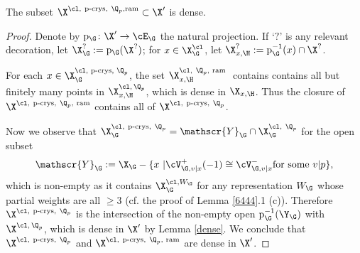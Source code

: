  \begin{lemm} 
 The subset $\X^{\cl,\ \textup{p-crys}, \  \Q_{p}, \textup{ram}}  \subset \X'$ is dense.
 \end{lemm}
 \begin{proof}
Denote by ${\rm p}_{\G} \colon \X' \to \cE_{\G}$ the natural projection.
 If  `$?$' is any relevant decoration, let  $\X_{\G}^{?}:= {\rm p}_{\G}(\X^{?})$; for  $x\in \X_{\G}^{\cl}$,  let $\X_{x, \H}^{?}:= {\rm p}_{\G}^{-1}(x)\cap  \X^{?}$.



For each $x\in \X_{\G}^{\cl, \textup{ p-crys, } \Q_{p}}$, the set
$ \X_{x,\H}^{\cl,  \ \Q_{p},   \textup{ ram }}$ contains contains all but finitely many points in
 $ \X_{x, \H}^{\cl, \, \Q_{p}}$, which is dense in  $\X_{x, \H}$. Thus the closure of $\X^{\cl,\ \text{p-crys}, \  \Q_{p}, \text{ ram}}$ contains all of $\X^{\cl,\ \text{p-crys},\  \Q_{p}}$.

 Now we observe that $\X_{\G}^{\cl, \ \text{p-crys},\  \Q_{p}} = \mathscr{Y}_{\G}\cap \X_{\G}^{\cl,\  \Q_{p}}$ for the open subset  $$\mathscr{Y}_{\G}:=\X_{\G}- \{ x\ | \cV_{\G, v|x }^{+}(-1)  \cong \cV_{\G, v|x}^{-} \text{for some $v\vert p$}\} ,$$ which is non-empty as it contains $\X_{\G}^{\cl, W_{\G}}$ for any representation $W_{\G}$ whose partial weights are all $\geq 3$ (cf. the proof of Lemma \ref{6444}.1 (c)).
Therefore  $\X^{\cl,\ \text{p-crys},\  \Q_{p}}$ is the intersection of the  non-empty open ${\rm p}_{\G}^{-1}(\Y_{\G})$ with  $\X^{\cl, \, \Q_{p}}$, which  is dense in $\X'$ by Lemma \ref{dense}.  We conclude that   $\X^{\cl,\ \text{p-crys},\  \Q_{p}}$ and  $\X^{\cl,\ \text{p-crys}, \  \Q_{p}, \text{ ram}}$ are dense in $\X'$.
 \end{proof}












